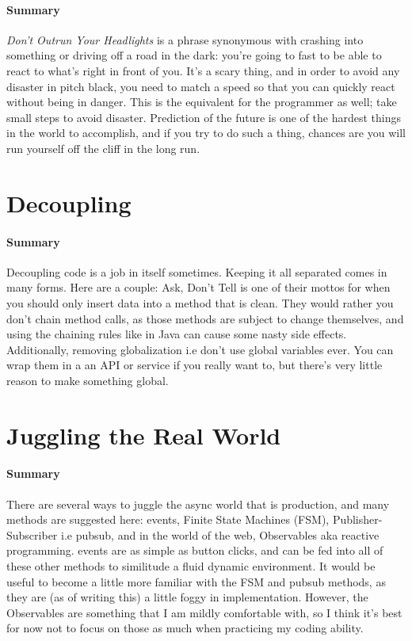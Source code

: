 \documentclass{article}
\begin{document}
    \paragraph{Summary} \textit{Don't Outrun Your Headlights} is a phrase synonymous with crashing into something or driving off a road in the dark: you're going to fast to be able to react to what's right in front of you. It's a scary thing, and in order to avoid any disaster in pitch black, you need to match a speed so that you can quickly react without being in danger. This is the equivalent for the programmer as well; take small steps to avoid disaster. Prediction of the future is one of the hardest things in the world to accomplish, and if you try to do such a thing, chances are you will run yourself off the cliff in the long run.

\section{Decoupling}
    \paragraph{Summary} Decoupling code is a job in itself sometimes. Keeping it all separated comes in many forms. Here are a couple: Ask, Don't Tell is one of their mottos for when you should only insert data into a method that is clean. They would rather you don't chain method calls, as those methods are subject to change themselves, and using the chaining rules like in Java can cause some nasty side effects. Additionally, removing globalization i.e don't use global variables ever. You can wrap them in a an API or service if you really want to, but there's very little reason to make something global.

\section{Juggling the Real World}
    \paragraph{Summary} There are several ways to juggle the async world that is production, and many methods are suggested here: events, Finite State Machines (FSM), Publisher-Subscriber i.e pubsub, and in the world of the web, Observables aka reactive programming. events are as simple as button clicks, and can be fed into all of these other methods to similitude a fluid dynamic environment. It would be useful to become a little more familiar with the FSM and pubsub methods, as they are (as of writing this) a little foggy in implementation. However, the Observables are something that I am mildly comfortable with, so I think it's best for now not to focus on those as much when practicing my coding ability.
\end{document}
